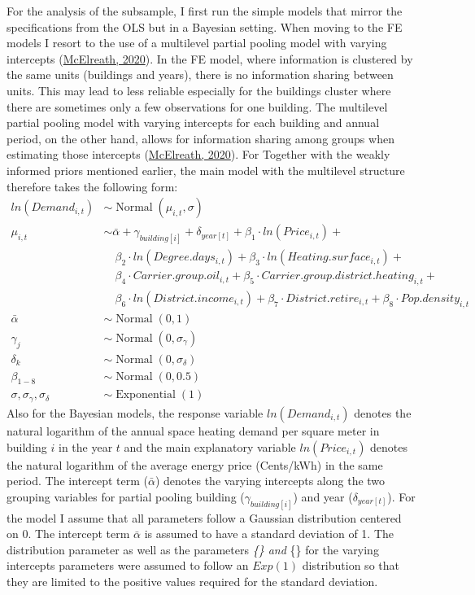 \documentclass[12pt,twoside]{reedthesis}
\begin{document}
For the analysis of the subsample, I first run the simple models that mirror the specifications from the OLS but in a Bayesian setting. When moving to the FE models I resort to the use of a multilevel partial pooling model with varying intercepts (\protect\hyperlink{ref-mcelreath20}{McElreath, 2020}). In the FE model, where information is clustered by the same units (buildings and years), there is no information sharing between units. This may lead to less reliable especially for the buildings cluster where there are sometimes only a few observations for one building. The multilevel partial pooling model with varying intercepts for each building and annual period, on the other hand, allows for information sharing among groups when estimating those intercepts (\protect\hyperlink{ref-mcelreath20}{McElreath, 2020}). For Together with the weakly informed priors mentioned earlier, the main model with the multilevel structure therefore takes the following form:
\begin{align*}
ln(Demand_{i,t}) & \sim \operatorname{Normal}(\mu_{i,t}, \sigma) \\
\mu_{i,t} & \sim \bar\alpha + \gamma_{building[i]} + \delta_{year[t]} + \beta_1 \cdot ln(Price_{i,t}) +  \\
 & \quad \beta_{2} \cdot ln(Degree.days_{i,t}) + \beta_{3} \cdot ln(Heating.surface_{i,t}) + \\
 & \quad \beta_{4} \cdot Carrier.group.oil_{i,t} + \beta_{5} \cdot Carrier.group.district.heating_{i,t} + \\
 & \quad \beta_{6} \cdot ln(District.income_{i,t}) + \beta_{7} \cdot District.retire_{i,t} + \beta_{8} \cdot Pop.density_{i,t} \\
\bar\alpha & \sim \operatorname{Normal}(0, 1) \\
\gamma_j & \sim \operatorname{Normal}(0, \sigma_{\gamma}) \\
\delta_k & \sim \operatorname{Normal}(0, \sigma_{\delta}) \\
\beta_{1-8} & \sim \operatorname{Normal}(0, 0.5) \\
\sigma, \sigma_{\gamma}, \sigma_{\delta} & \sim \operatorname{Exponential}(1)
\end{align*}
Also for the Bayesian models, the response variable \(ln(Demand_{i,t})\) denotes the natural logarithm of the annual space heating demand per square meter in building \(i\) in the year \(t\) and the main explanatory variable \(ln(Price_{i,t})\) denotes the natural logarithm of the average energy price (Cents/kWh) in the same period. The intercept term (\(\bar \alpha\)) denotes the varying intercepts along the two grouping variables for partial pooling building (\(\gamma_{building[i]}\)) and year (\(\delta_{year[t]}\)). For the model I assume that all parameters follow a Gaussian distribution centered on 0. The intercept term \(\bar \alpha\) is assumed to have a standard deviation of 1. The distribution parameter \sigma as well as the parameters \sigma\emph{\{\gamma\} and \sigma}\{\delta\} for the varying intercepts parameters were assumed to follow an \(Exp(1)\) distribution so that they are limited to the positive values required for the standard deviation.
\end{document}
